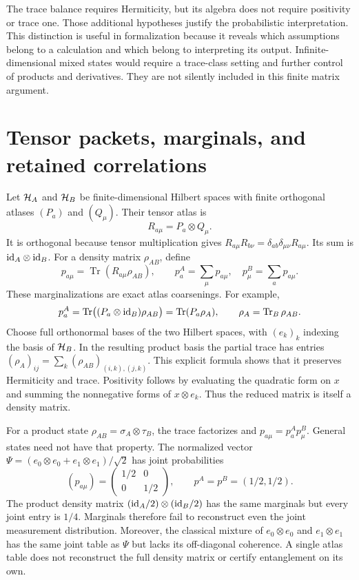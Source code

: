The trace balance requires Hermiticity, but its algebra does not require positivity or trace one. Those additional hypotheses justify the probabilistic interpretation. This distinction is useful in formalization because it reveals which assumptions belong to a calculation and which belong to interpreting its output. Infinite-dimensional mixed states would require a trace-class setting and further control of products and derivatives. They are not silently included in this finite matrix argument.



\section{Tensor packets, marginals, and retained correlations}\label{f:tensor}

Let $\mathcal H_A$ and $\mathcal H_B$ be finite-dimensional Hilbert spaces with finite orthogonal atlases $(P_a)$ and $(Q_\mu)$. Their tensor atlas is
\[
 R_{a\mu}=P_a\otimes Q_\mu.
\]
It is orthogonal because tensor multiplication gives
$R_{a\mu}R_{b\nu}=\delta_{ab}\delta_{\mu\nu}R_{a\mu}$.
Its sum is $\mathrm{id}_A\otimes\mathrm{id}_B$. For a density matrix $\rho_{AB}$, define
\begin{equation}\label{f:joint-marginal}
 p_{a\mu}=\operatorname{Tr}(R_{a\mu}\rho_{AB}),\qquad
 p_a^A=\sum_\mu p_{a\mu},\quad p_\mu^B=\sum_a p_{a\mu}.
\end{equation}
These marginalizations are exact atlas coarsenings. For example,
\[
 p_a^A=\operatorname{Tr}\bigl((P_a\otimes\mathrm{id}_B)\rho_{AB}\bigr)
 =\operatorname{Tr}(P_a\rho_A),\qquad \rho_A=\operatorname{Tr}_B\rho_{AB}.
\]
Choose full orthonormal bases of the two Hilbert spaces, with $(e_k)_k$ indexing the basis of $\mathcal H_B$. In the resulting product basis the partial trace has entries
$(\rho_A)_{ij}=\sum_k(\rho_{AB})_{(i,k),(j,k)}$.
This explicit formula shows that it preserves Hermiticity and trace. Positivity follows by evaluating the quadratic form on $x$ and summing the nonnegative forms of $x\otimes e_k$. Thus the reduced matrix is itself a density matrix.

For a product state $\rho_{AB}=\sigma_A\otimes\tau_B$, the trace factorizes and $p_{a\mu}=p_a^Ap_\mu^B$. General states need not have that property. The normalized vector
$\Psi=(e_0\otimes e_0+e_1\otimes e_1)/\sqrt2$ has joint probabilities
\[
 (p_{a\mu})=\begin{pmatrix}1/2&0\\0&1/2\end{pmatrix},
 \qquad p^A=p^B=(1/2,1/2).
\]
The product density matrix $(\mathrm{id}_A/2)\otimes(\mathrm{id}_B/2)$ has the same marginals but every joint entry is $1/4$. Marginals therefore fail to reconstruct even the joint measurement distribution. Moreover, the classical mixture of $e_0\otimes e_0$ and $e_1\otimes e_1$ has the same joint table as $\Psi$ but lacks its off-diagonal coherence. A single atlas table does not reconstruct the full density matrix or certify entanglement on its own.

